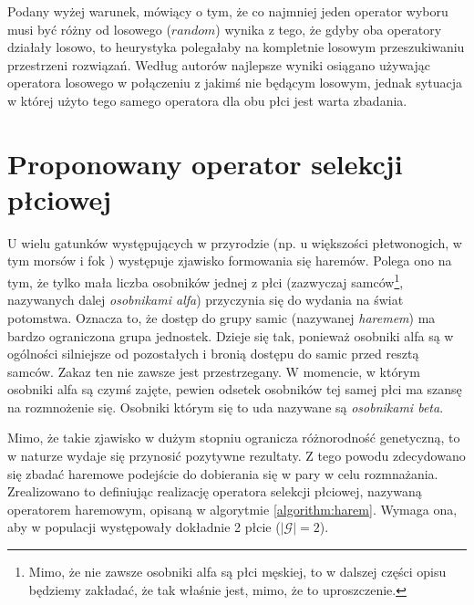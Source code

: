 \documentclass[twoside]{iisthesis}
\newcommand{\important}[1]{\mathcal{#1}}
\begin{document}
Podany wyżej warunek, mówiący o tym, że co najmniej jeden operator wyboru musi być różny od losowego ($random$) wynika z tego, że gdyby oba operatory działały losowo, to heurystyka polegałaby na kompletnie losowym przeszukiwaniu przestrzeni rozwiązań.
Według autorów najlepsze wyniki osiągano używając operatora losowego w połączeniu z jakimś nie będącym losowym, jednak sytuacja w której użyto tego samego operatora dla obu płci jest warta zbadania.

\section{Proponowany operator selekcji płciowej}

U wielu gatunków występujących w przyrodzie (np. u większości płetwonogich, w tym morsów i fok \cite{pletwonogiMajaHaremy}) występuje zjawisko formowania się haremów.
Polega ono na tym, że tylko mała liczba osobników jednej z płci (zazwyczaj samców\footnote{
	Mimo, że nie zawsze osobniki alfa są płci męskiej, to w dalszej części opisu będziemy zakładać, że tak właśnie jest, mimo, że to uproszczenie.
}, nazywanych dalej \emph{osobnikami alfa}) przyczynia się do wydania na świat potomstwa.
Oznacza to, że dostęp do grupy samic (nazywanej \emph{haremem}) ma bardzo ograniczona grupa jednostek.
Dzieje się tak, ponieważ osobniki alfa są w ogólności silniejsze od pozostałych i bronią dostępu do samic przed resztą samców.
Zakaz ten nie zawsze jest przestrzegany.
W momencie, w którym osobniki alfa są czymś zajęte, pewien odsetek osobników tej samej płci ma szansę na rozmnożenie się.
Osobniki którym się to uda nazywane są \emph{osobnikami beta}.

Mimo, że takie zjawisko w dużym stopniu ogranicza różnorodność genetyczną, to w naturze wydaje się przynosić pozytywne rezultaty.
Z tego powodu zdecydowano się zbadać haremowe podejście do dobierania się w pary w celu rozmnażania.
Zrealizowano to definiując realizację operatora selekcji płciowej, nazywaną operatorem haremowym, opisaną w algorytmie \ref{algorithm:harem}. Wymaga ona, aby w populacji występowały dokładnie 2 płcie ($|\important{G}| = 2$).
\end{document}
